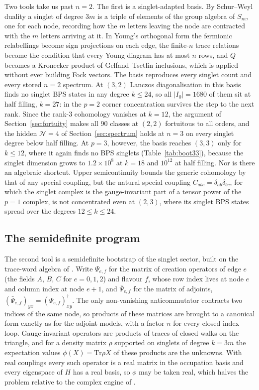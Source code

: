 \documentclass[10pt]{article}
\newcommand{\Tr}{\mathrm{Tr}}
\begin{document}
Two tools take us past $n=2$. The first is a singlet-adapted basis. By Schur--Weyl duality a singlet of degree $3m$
is a triple of elements of the group algebra of $S_m$, one for each node, recording how the $m$ letters leaving the
node are contracted with the $m$ letters arriving at it. In Young's orthogonal form the fermionic relabellings become
sign projections on each edge, the finite-$n$ trace relations become the condition that every Young diagram has at
most $n$ rows, and $Q$ becomes a Kronecker product of Gelfand--Tsetlin inclusions, which is applied without ever
building Fock vectors. The basis reproduces every singlet count and every stored $n=2$ spectrum. At $(3,2)$ Lanczos
diagonalisation in this basis finds no singlet BPS states in any degree $k\le24$, so all $|I_0|=1680$ of them sit at
half filling, $k=27$: in the $p=2$ corner concentration survives the step to the next rank. Since the rank-3
cohomology vanishes at $k=12$, the argument of Section~\ref{sec:fortuity} makes all 90 classes at $(2,2)$ fortuitous
to all orders, and the hidden $\mathcal N=4$ of Section~\ref{sec:spectrum} holds at $n=3$ on every singlet degree
below half filling. At $p=3$, however, the basis reaches $(3,3)$ only for $k\le12$, where it again finds no BPS
singlets (Table~\ref{tab:boot33}), because the singlet dimension grows to $1.2\times10^8$ at $k=18$ and $10^{12}$ at
half filling. Nor is there an algebraic shortcut. Upper semicontinuity bounds the generic cohomology by that of any
special coupling, but the natural special coupling $C_{abc}=\delta_{ab}\delta_{bc}$, for which the singlet complex is
the gauge-invariant part of a tensor power of the $p=1$ complex, is not concentrated even at $(2,3)$, where its
singlet BPS states spread over the degrees $12\le k\le24$.

\subsection{The semidefinite program}

The second tool is a semidefinite bootstrap of the singlet sector, built on the trace-word algebra of \cite{R2}.
Write $\Psi_{e,f}$ for the matrix of creation operators of edge $e$ (the fields $A$, $B$, $C$ for $e=0,1,2$) and
flavour $f$, whose row index lives at node $e$ and column index at node $e+1$, and $\bar\Psi_{e,f}$ for the matrix of
adjoints, $(\bar\Psi_{e,f})_{yx}=(\Psi_{e,f})^\dagger_{xy}$. The only non-vanishing anticommutator contracts two
indices of the same node, so products of these matrices are brought to a canonical form exactly as for the adjoint
models, with a factor $n$ for every closed index loop. Gauge-invariant operators are products of traces of closed walks
on the triangle, and for a density matrix $\rho$ supported on singlets of degree $k=3m$ the expectation values
$\phi(X)=\Tr\rho X$ of these products are the unknowns. With real couplings every such operator is a real matrix in the
occupation basis and every eigenspace of $H$ has a real basis, so $\phi$ may be taken real, which halves the problem
relative to the complex engine of \cite{R2}.
\end{document}
